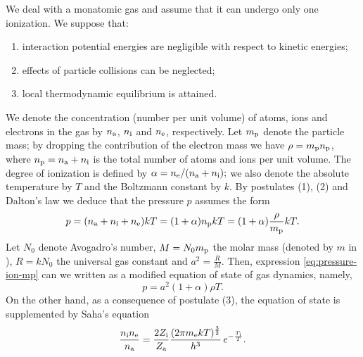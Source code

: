 \documentclass[10pt,a4paper]{article}
\numberwithin{equation}{section}
\begin{document}
We  deal with a monatomic gas and assume that it can undergo only one ionization. We suppose that:

\begin{enumerate}[(1)] 

\item interaction potential energies are negligible with respect to kinetic energies;

\item effects of particle collisions can be neglected; 

\item local thermodynamic equilibrium is attained.

\end{enumerate}
We denote the concentration (number per unit volume) of atoms, ions and electrons in the gas by $n_{\rm a}$, $n_{\rm i}$ and $n_{\rm e}$, respectively. Let $m_{\rm p}$ denote the particle mass; by dropping the contribution of the electron mass we have $\rho = m_{\rm p}n_{\rm p}$, where $n_{\rm p} = n_{\rm a}+n_{\rm i}$ is the total number of atoms and ions per unit volume. The degree of ionization is defined by $\alpha = n_{\rm e}/(n_{\rm a} + n_{\rm i});$ we also denote the absolute temperature by $T$ and the Boltzmann constant by $k$. By  postulates (1), (2) and Dalton's law we deduce that the pressure $p$ assumes  the form 
\begin{equation}\label{eq:pressure-ion-mp}
p = (n_{\rm a}+n_{\rm i}+n_{\rm e})kT = (1+\alpha)n_{\rm p}kT = (1+\alpha)\frac{\rho}{m_{\rm p}}kT.
\end{equation}
Let $N_0$ denote Avogadro's number, $M = N_0 m_{\rm p}$ the molar mass  (denoted by $m$ in \cite{Asakura-Corli_ionized}), $R = k N_0$ the universal gas constant and $a^2=\frac{R}{M}$. Then, expression \eqref{eq:pressure-ion-mp} can we written as a modified equation of state of gas dynamics, namely, 
\begin{equation}\label{eq:EOS}
  p = a^2(1 + \alpha)\rho T.
\end{equation}
On the other hand, as a consequence of postulate (3), the equation of state is supplemented by Saha's equation
\begin{equation}\label{eq:saha}
\frac{n_{\rm i} n_{\rm e}}{n_{\rm a}} = \frac{2Z_{\rm i}}{Z_{\rm a}} \frac{(2\pi m_{\rm e} kT)^{\frac{3}{2}}}{h^3}\, e^{-\frac{T_{\rm i}}{T}}.
\end{equation}
\end{document}
